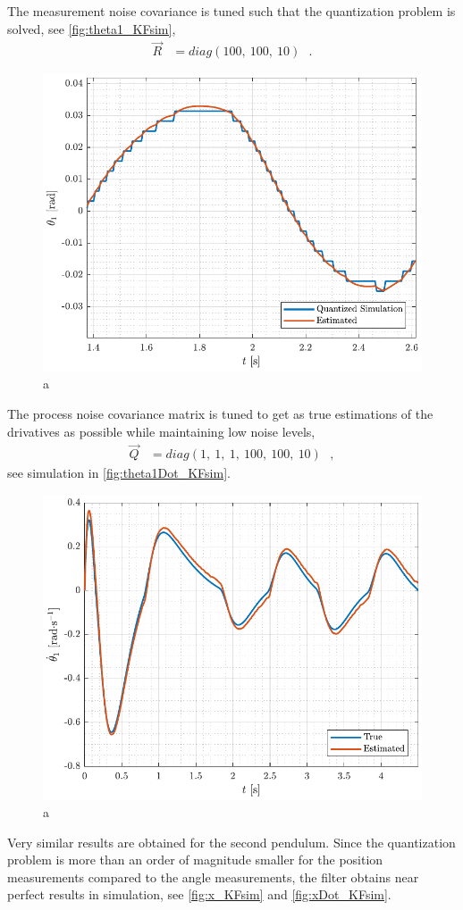The measurement noise covariance is tuned such that the quantization problem is solved, see \autoref{fig:theta1_KFsim},
\begin{align}
\vec{R} &= diag( 100,\ 100,\ 10 )  \ \ \ .
\end{align}
%
\begin{figure}[H]
  \includegraphics[width=.7\textwidth]{figures/theta1_KFsim}
  \caption{a}
  \label{fig:theta1_KFsim}
\end{figure}
%
The process noise covariance matrix is tuned to get as true estimations of the drivatives as possible while maintaining low noise levels,
\begin{align}
\vec{Q} &= diag( 1,\ 1,\ 1,\ 100,\ 100,\ 10 )  \ \ \ ,
\end{align}
see simulation in \autoref{fig:theta1Dot_KFsim}.
%
\begin{figure}[H]
  \includegraphics[width=.7\textwidth]{figures/theta1Dot_KFsim}
  \caption{a}
  \label{fig:theta1Dot_KFsim}
\end{figure}
%
Very similar results are obtained for the second pendulum. Since the quantization problem is more than an order of magnitude smaller for the position measurements compared to the angle measurements, the filter obtains near perfect results in simulation, see \autoref{fig:x_KFsim} and \ref{fig:xDot_KFsim}.
